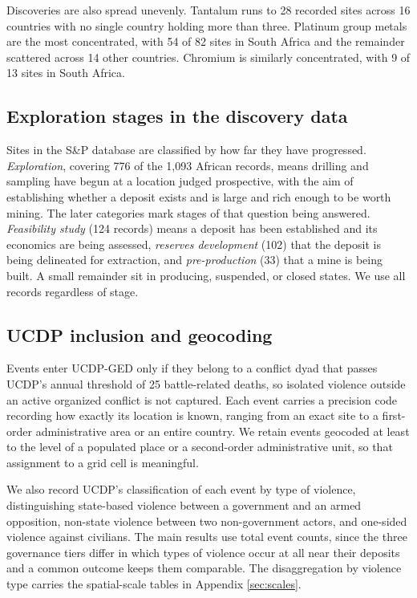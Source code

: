 \documentclass[11pt]{article}
\begin{document}
Discoveries are also spread unevenly. Tantalum runs to 28 recorded sites across
16 countries with no single country holding more than three. Platinum group
metals are the most concentrated, with 54 of 82 sites in South Africa and the
remainder scattered across 14 other countries. Chromium is similarly
concentrated, with 9 of 13 sites in South Africa.

\subsection*{Exploration stages in the discovery data}

Sites in the S\&P database are classified by how far they have progressed.
\textit{Exploration}, covering 776 of the 1,093 African records, means drilling
and sampling have begun at a location judged prospective, with the aim of
establishing whether a deposit exists and is large and rich enough to be worth
mining. The later categories mark stages of that question being answered.
\textit{Feasibility study} (124 records) means a deposit has been established and
its economics are being assessed, \textit{reserves development} (102) that the
deposit is being delineated for extraction, and \textit{pre-production} (33) that
a mine is being built. A small remainder sit in producing, suspended, or closed
states. We use all records regardless of stage.

\subsection*{UCDP inclusion and geocoding}

Events enter UCDP-GED only if they belong to a conflict dyad that passes UCDP's
annual threshold of 25 battle-related deaths, so isolated violence outside an
active organized conflict is not captured. Each event carries a precision code
recording how exactly its location is known, ranging from an exact site to a
first-order administrative area or an entire country. We retain events geocoded
at least to the level of a populated place or a second-order administrative
unit, so that assignment to a grid cell is meaningful.

We also record UCDP's classification of each event by type of violence,
distinguishing state-based violence between a government and an armed
opposition, non-state violence between two non-government actors, and one-sided
violence against civilians. The main results use total event counts, since the
three governance tiers differ in which types of violence occur at all near their
deposits and a common outcome keeps them comparable. The disaggregation by
violence type carries the spatial-scale tables in Appendix \ref{sec:scales}.
\end{document}
